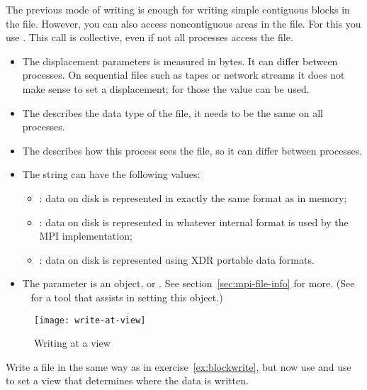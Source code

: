 The previous mode of writing is enough for writing simple contiguous blocks in the file.
However,
you can also access noncontiguous areas in the file. For this you use
%
.
%
This call is collective, even if not all processes access the file.
\begin{itemize}
\item The  displacement parameters is measured in bytes. It
  can differ between processes. On sequential files such as tapes or
  network streams it does not make sense to set a displacement; for
  those the  value can be
  used.
\item The  describes the data type of the file, it needs to
  be the same on all processes.
\item The  describes how this process sees the file, so it
  can differ between processes.
\item The  string can have the following values:
  \begin{itemize}
  \item {}: data on disk is represented in exactly the same
    format as in memory;
  \item {}: data on disk is represented in whatever internal
    format is used by the MPI implementation;
  \item {}: data on disk is represented using XDR portable
    data formats.
  \end{itemize}
\item The  parameter is an  object,
  or . See section~\ref{sec:mpi-file-info} for more.
  (See ~\cite{t3pio-git} for a tool that 
  assists in setting this object.)
\end{itemize}

\begin{figure}[ht]
  \label{fig:write-view}
  \caption{Writing at a view}
  \texttt{[image: write-at-view]}
\end{figure}

\begin{exercise}
  \label{ex:viewwrite}
  Write a file in the same way as in exercise~\ref{ex:blockwrite},
  but now use  and use  to set
  a view that determines where the data is written.
\end{exercise}

